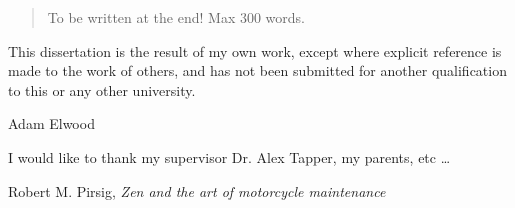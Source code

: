 
\begin{abstract}%
  To be written at the end! Max 300 words.
\end{abstract}


\begin{declaration}
  This dissertation is the result of my own work, except where explicit
  reference is made to the work of others, and has not been submitted
  for another qualification to this or any other university.
  \vspace*{1cm}
  \begin{flushright}
    Adam Elwood
  \end{flushright}
\end{declaration}


\begin{acknowledgements}
  I would like to thank my supervisor Dr. Alex Tapper, my parents, etc
  \dots
\end{acknowledgements}


%
%


%
{Robert M. Pirsig, \emph{Zen and the art of motorcycle maintenance}}


